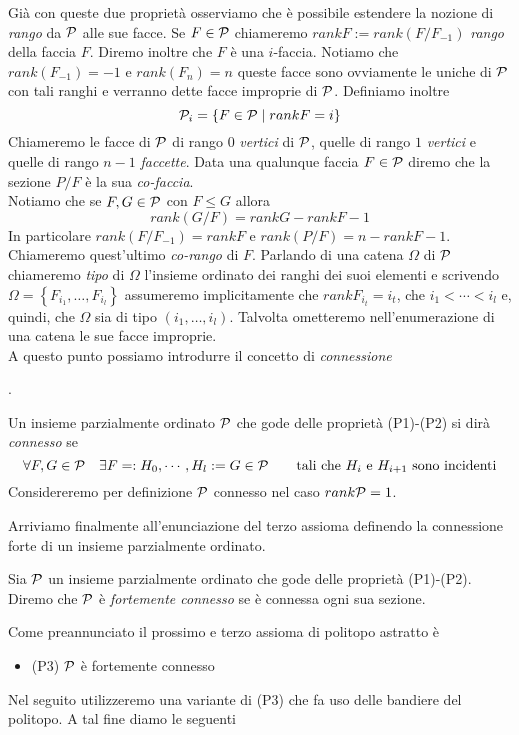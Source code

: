 \par
Gi\`a con queste due propriet\`a osserviamo che \`e possibile estendere la 
nozione di \emph{rango} da $\mathcal{P}$ alle sue facce.
Se $F\in\mathcal{P}$ chiameremo $rankF:=rank(F/F_{-1})$ \emph{rango} della faccia $F$. 
Diremo inoltre che $F$ \`e una $i$-faccia.
Notiamo che $rank(F_{-1})=-1$ e $rank(F_n)=n$ queste facce sono ovviamente le 
uniche di $\mathcal{P}$ con tali ranghi e verranno dette
facce improprie di $\mathcal{P}$.
Definiamo inoltre
\begin{equation*}
\mathcal{P}_i=\left\{F\in\mathcal{P}\mid rankF=i\right\}
\end{equation*}
Chiameremo le facce di $\mathcal{P}$ di rango $0$ \emph{vertici} di $\mathcal{P}$, quelle di rango 
$1$ \emph{vertici} e quelle di rango $n-1$ \emph{faccette}. Data 
una qualunque faccia $F\in\mathcal{P}$ diremo che la sezione $P/F$ \`e la sua 
\emph{co-faccia}.\\
Notiamo che se $F,G\in\mathcal{P}$ con $F\leq G$ allora
\begin{equation*}
rank(G/F)=rankG-rankF-1
\end{equation*}
In particolare $rank(F/F_{-1})=rankF$ e $rank(P/F)=n-rankF-1$. Chiameremo 
quest'ultimo \emph{co-rango} di $F$.
Parlando di una catena $\Omega$ di $\mathcal{P}$ chiameremo \emph{tipo} di $\Omega$ 
l'insieme ordinato dei ranghi dei suoi elementi e scrivendo 
$\Omega=\left\{F_{i_1},\dots,F_{i_l}\right\}$ assumeremo implicitamente che 
$rankF_{i_t}=i_t$, che $i_1<\cdots<i_l$ e, quindi,
che $\Omega$ sia di tipo $(i_1,\dots,i_l)$.
Talvolta ometteremo nell'enumerazione di una catena le sue facce improprie.\\
A questo punto possiamo introdurre il concetto di \emph{connessione}

.
\begin{defin}
Un insieme parzialmente ordinato $\mathcal{P}$ che gode delle propriet\`a (P1)-(P2) si 
dir\`a \emph{connesso} se
\begin{equation*}
\forall F,G\in\mathcal{P}\quad\exists F=:H_0,\cdots,H_l:=G\in\mathcal{P}\qquad \text{tali che 
}H_i\text{ e }H_{i+1}\text{ sono incidenti}
\end{equation*}
Considereremo per definizione $\mathcal{P}$ connesso nel caso $rank\mathcal{P}=1$.
\end{defin}
Arriviamo finalmente all'enunciazione del terzo assioma definendo la connessione 
forte di un insieme parzialmente ordinato.
\begin{defin}
Sia $\mathcal{P}$ un insieme parzialmente ordinato che gode delle propriet\`a (P1)-(P2). 
Diremo che $\mathcal{P}$ \`e \emph{fortemente connesso} se
\`e connessa ogni sua sezione.
\end{defin}
Come preannunciato il prossimo e terzo assioma di politopo astratto \`e
\begin{itemize}
\item (P3) $\mathcal{P}$ \`e fortemente connesso
\end{itemize}
Nel seguito utilizzeremo una variante di (P3) che fa uso delle bandiere del 
politopo. A tal fine diamo le seguenti



